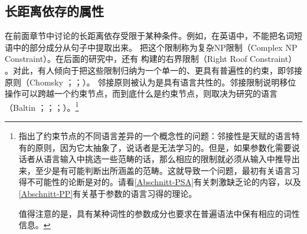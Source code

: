 \subsection{长距离依存的属性}
\label{Abschnitt-Fernabhängigkeiten}

在前面章节中讨论的长距离依存受限于某种条件。例如，在英语中，不能把名词短语中的部分成分从句子中提取出来。 \citet[]{Ross67}把这个限制称为复杂NP限制（Complex NP Constraint）。在后面的研究中，还有 \citet[\S~5.1.2]{Ross67}构建的右界限制（Right Roof Constraint）
。对此，有人倾向于把这些限制归纳为一个单一的、更具有普遍性的约束，即邻接原则（Chomsky \citeyear[]{Chomsky73a}；\citeyear[]{Chomsky86b}；\citealp{Baltin81a,Baltin2006a}）。
邻接原则被认为是具有语言共性的。邻接限制说明移位操作可以跨越一个约束节点，而到底什么是约束节点，则取决为研究的语言（Baltin \citeyear[]{Baltin81a}；\citeyear{Baltin2006a}；\citealp[]{Rizzi82b}；\citealp[--40]{Chomsky86b}）。\footnote{%
 \citet[--540]{Newmeyer2004a}指出了约束节点的不同语言差异的一个概念性的问题：邻接性是天赋的语言特有的原则，因为它太抽象了，说话者是无法学习的。但是，如果参数化需要说话者从语言输入中挑选一些范畴的话，那么相应的限制就必须从输入中推导出来，至少是有可能判断出所涵盖的范畴。这就导致一个问题，最初有关语言习得不可能性的论断是对的。请看\ref{Abschnitt-PSA}有关刺激缺乏论的内容，以及\ref{Abschnitt-PP}有关基于参数的语言习得的理论。

值得注意的是，具有某种词性的参数成分也要求在普遍语法中保有相应的词性信息。
}
